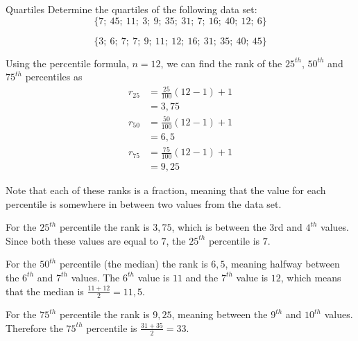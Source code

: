\begin{wex}{Quartiles}{
    Determine the quartiles of the following data set:
    \begin{equation*}
      \{7;\ 45;\ 11;\ 3;\ 9;\ 35;\ 31;\ 7;\ 16;\ 40;\ 12;\ 6\}
    \end{equation*}
}{
    \begin{equation*}
      \{3;\ 6;\ 7;\ 7;\ 9;\ 11;\ 12;\ 16;\ 31;\ 35;\ 40;\ 45\}
    \end{equation*}


    Using the percentile formula, $n=12$, we can find the rank of the $25^{th}$,
    $50^{th}$ and $75^{th}$ percentiles as
    \begin{align*}
      r_{25} &= \frac{25}{100}\left(12-1\right)+1 \\
            &= 3,75 \\
      r_{50} &= \frac{50}{100}\left(12-1\right)+1 \\
            &= 6,5 \\
      r_{75} &= \frac{75}{100}\left(12-1\right)+1 \\
            &= 9,25
    \end{align*}


    Note that each of these ranks is a fraction, meaning that the
    value for each percentile is somewhere in between two values from
    the data set.\par

    For the $25^{th}$ percentile the rank is $3,75$, which is between
    the $3$rd and $4^{th}$ values. Since both these values are equal to
    $7$, the $25^{th}$ percentile is $7$.\par

    For the $50^{th}$ percentile (the median) the rank is $6,5$, meaning
    halfway between the $6^{th}$ and $7^{th}$ values. The $6^{th}$ value is
    $11$ and the $7^{th}$ value is $12$, which means that the median is
    \(\frac{11+12}{2} = 11,5\).\par

    For the $75^{th}$ percentile the rank is $9,25$, meaning between the
    $9^{th}$ and $10^{th}$ values. Therefore the $75^{th}$ percentile is
    \(\frac{31+35}{2} = 33\).

  }
\end{wex}

